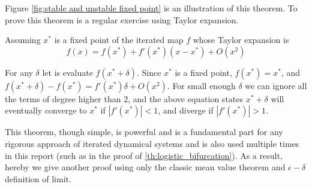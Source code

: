 Figure \ref{fig:stable and unstable fixed point} is an illustration of this theorem.
To prove this theorem is a regular exercise using Taylor expansion. 

Assuming $x^*$ is a fixed point of the iterated map $f$ whose Taylor expansion is
$$f(x) = f(x^*) + f'(x^*) (x - x^*) + O(x^2)$$

For any $\delta$ let is evaluate $f(x^* + \delta)$.
Since $x^*$ is a fixed point,
 $f(x^*) = x^*$, and
 $f(x^* + \delta) - f(x^*) = f'(x^*) \delta + O(x^2)$. 
For small enough $\delta$ we can ignore all the terms of degree higher than $2$, and the above equation states $x^*+ \delta$ will eventually converge to $x^*$ if $|f'(x^*)| < 1$, and diverge if $|f'(x^*)| > 1$.

This theorem, though simple, is powerful and is a fundamental part for any rigorous approach of iterated dynamical systems and is also used multiple times in this report (such as in the proof of \ref{th:logistic_bifurcation}). 
As a result, hereby we give another proof using only the classic mean value theorem and $\epsilon-\delta$ definition of limit.

